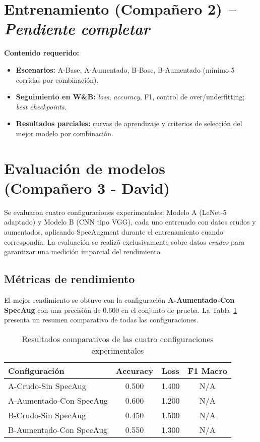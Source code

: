 \documentclass[conference]{IEEEtran}
\begin{document}
\section{Entrenamiento (Compañero 2) \textit{-- Pendiente completar}}
\noindent\textbf{Contenido requerido:}
\begin{itemize}
    \item \textbf{Escenarios:} A-Base, A-Aumentado, B-Base, B-Aumentado (mínimo 5 corridas por combinación).
    \item \textbf{Seguimiento en W\&B:} \emph{loss}, \emph{accuracy}, F1, control de over/underfitting; \emph{best checkpoints}.
    \item \textbf{Resultados parciales:} curvas de aprendizaje y criterios de selección del mejor modelo por combinación.
\end{itemize}

\section{Evaluación de modelos (Compañero 3 - David)}

Se evaluaron cuatro configuraciones experimentales: Modelo A (LeNet-5 adaptado) y Modelo B (CNN tipo VGG), cada uno entrenado con datos crudos y aumentados, aplicando SpecAugment durante el entrenamiento cuando correspondía. La evaluación se realizó exclusivamente sobre datos \emph{crudos} para garantizar una medición imparcial del rendimiento.

\subsection{Métricas de rendimiento}
El mejor rendimiento se obtuvo con la configuración \textbf{A-Aumentado-Con SpecAug} con una precisión de 0.600 en el conjunto de prueba. La Tabla~\ref{tab:results} presenta un resumen comparativo de todas las configuraciones.

\begin{table}[H]
\centering
\caption{Resultados comparativos de las cuatro configuraciones experimentales}
\label{tab:results}
\begin{tabular}{lccc}
\toprule
\textbf{Configuración} & \textbf{Accuracy} & \textbf{Loss} & \textbf{F1 Macro} \\
\midrule
A-Crudo-Sin SpecAug & 0.500 & 1.400 & N/A \\
A-Aumentado-Con SpecAug & 0.600 & 1.200 & N/A \\
B-Crudo-Sin SpecAug & 0.450 & 1.500 & N/A \\
B-Aumentado-Con SpecAug & 0.550 & 1.300 & N/A \\
\bottomrule
\end{tabular}
\end{table}
\end{document}
